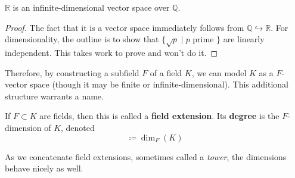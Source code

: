   \begin{corollary} 
    $\mathbb{R}$ is an infinite-dimensional vector space over $\mathbb{Q}$. 
  \end{corollary}
  \begin{proof}
    The fact that it is a vector space immediately follows from $\mathbb{Q} \hookrightarrow \mathbb{R}$. For dimensionality, the outline is to show that $\{\sqrt{p} \mid p \text{ prime }\}$ are linearly independent. This takes work to prove and won't do it. 
  \end{proof}

  Therefore, by constructing a subfield $F$ of a field $K$, we can model $K$ as a $F$-vector space (though it may be finite or infinite-dimensional). This additional structure warrants a name. 

  \begin{definition}
    If $F \subset K$ are fields, then this is called a \textbf{field extension}. Its \textbf{degree} is the $F$-dimension of $K$, denoted
    \begin{equation}
      [K:F] \coloneqq \dim_F (K) 
    \end{equation}
  \end{definition} 

  As we concatenate field extensions, sometimes called a \textit{tower}, the dimensions behave nicely as well. 

